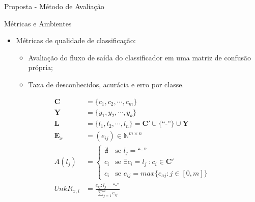 \documentclass[aspectratio=1610,10pt]{beamer}
\begin{document}
\begin{frame}[fragile]{Proposta - Método de Avaliação}
\begin{alertblock}{Métricas e Ambientes}
  \begin{itemize}
    \item Métricas de qualidade de classificação:
    \begin{itemize}
      \item Avaliação do fluxo de saída do classificador em uma matriz de confusão própria;
      \item Taxa de desconhecidos, acurácia e erro por classe.
    \end{itemize}
  \end{itemize}
\end{alertblock}
\hspace{-1cm}
{
\small
\begin{minipage}{.55\textwidth}
  \begin{align}
    \mathbf{C} &= \{ c_1, c_2, \cdots, c_m \}\\
    \mathbf{Y} &= \{ y_1, y_2, \cdots, y_k \}\\
    \mathbf{L} &= \{ l_1, l_2, \cdots, l_n \} = \mathbf{C}' \cup \{ \text{``-''} \} \cup \mathbf{Y}\\
    \mathbf{E}_x &= (e_{ij})\in \mathbb{N} ^{m\times n}\\
      A(l_j) &= \begin{cases} 
        \nexists & \text{se } l_j = \text{``-''} \\
        c_i      & \text{se } \exists c_i = l_j \;: c_i \in \mathbf{C}' \\
        c_i      & \text{se } e_{ij} = max\{ e_{aj} : j \in [0, m] \}
      \end{cases}\\
      \mathit{UnkR}_{x, i} &= \frac{e_{i j} : l_j = \text{``-''}}{\sum_{j=1}^{n} e_{i j}}
  \end{align}
\end{minipage}%
}
\end{frame}
\end{document}
